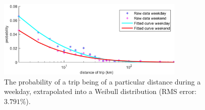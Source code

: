 \begin{figure}\centering
	\includegraphics[width=0.8\textwidth]{_chapter4/fig/trip-distance-probability}
	\caption{The probability of a trip being of a particular distance during a weekday, extrapolated into a Weibull distribution (RMS error: $3.791\%$).}
	\label{ch4:fig:trip-distance-probability}
\end{figure}
